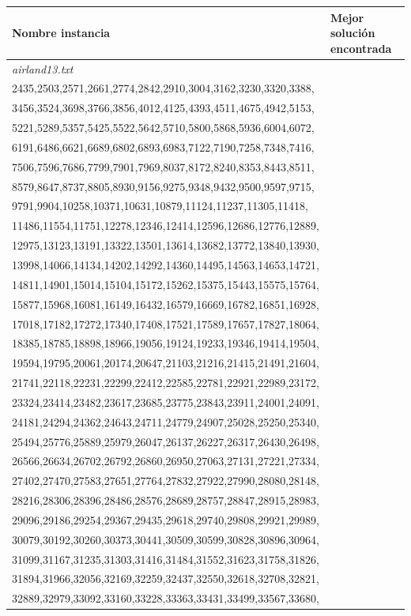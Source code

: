 \documentclass[letter, 10pt]{article}
\begin{document}
    \begin{table}[h]
    \centering
    \begin{tabular}{|l|l|}
    \hline
    \textbf{Nombre instancia} & \textbf{Mejor solución encontrada}                                      \\ \hline
    \textit{airland13.txt}    & \begin{tabular}[c]{@{}l@{}}{[}601,1020,1133,1201,1314,1382,1631,1725,1848,1961,2190,2345,\\ 2435,2503,2571,2661,2774,2842,2910,3004,3162,3230,3320,3388,\\ 3456,3524,3698,3766,3856,4012,4125,4393,4511,4675,4942,5153,\\ 5221,5289,5357,5425,5522,5642,5710,5800,5868,5936,6004,6072,\\ 6191,6486,6621,6689,6802,6893,6983,7122,7190,7258,7348,7416,\\ 7506,7596,7686,7799,7901,7969,8037,8172,8240,8353,8443,8511,\\ 8579,8647,8737,8805,8930,9156,9275,9348,9432,9500,9597,9715,\\ 9791,9904,10258,10371,10631,10879,11124,11237,11305,11418,\\ 11486,11554,11751,12278,12346,12414,12596,12686,12776,12889,\\ 12975,13123,13191,13322,13501,13614,13682,13772,13840,13930,\\ 13998,14066,14134,14202,14292,14360,14495,14563,14653,14721,\\ 14811,14901,15014,15104,15172,15262,15375,15443,15575,15764,\\ 15877,15968,16081,16149,16432,16579,16669,16782,16851,16928,\\ 17018,17182,17272,17340,17408,17521,17589,17657,17827,18064,\\ 18385,18785,18898,18966,19056,19124,19233,19346,19414,19504,\\ 19594,19795,20061,20174,20647,21103,21216,21415,21491,21604,\\ 21741,22118,22231,22299,22412,22585,22781,22921,22989,23172,\\ 23324,23414,23482,23617,23685,23775,23843,23911,24001,24091,\\ 24181,24294,24362,24643,24711,24779,24907,25028,25250,25340,\\ 25494,25776,25889,25979,26047,26137,26227,26317,26430,26498,\\ 26566,26634,26702,26792,26860,26950,27063,27131,27221,27334,\\ 27402,27470,27583,27651,27764,27832,27922,27990,28080,28148,\\ 28216,28306,28396,28486,28576,28689,28757,28847,28915,28983,\\ 29096,29186,29254,29367,29435,29618,29740,29808,29921,29989,\\ 30079,30192,30260,30373,30441,30509,30599,30828,30896,30964,\\ 31099,31167,31235,31303,31416,31484,31552,31623,31758,31826,\\ 31894,31966,32056,32169,32259,32437,32550,32618,32708,32821,\\ 32889,32979,33092,33160,33228,33363,33431,33499,33567,33680,\\ 
\end{tabular}
\end{table}
\end{document}
